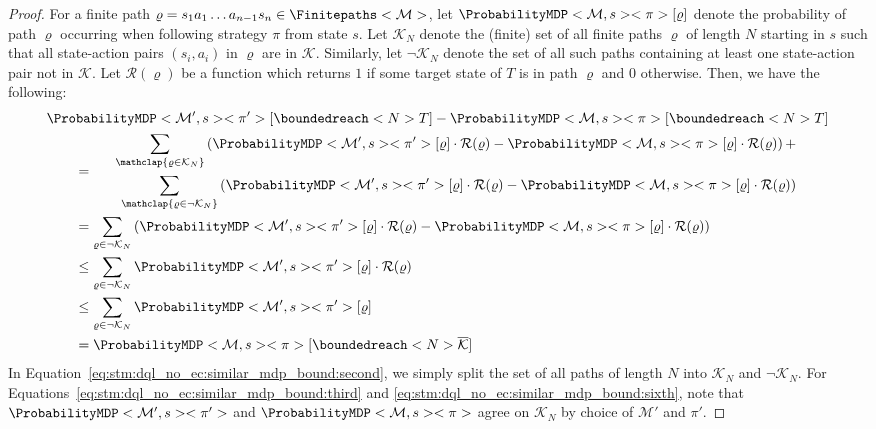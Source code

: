 \documentclass{article}
\newcommand{\MDP}{\mathcal{M}}
\newcommand{\finitepath}{\varrho}
\newcommand{\strategy}{\pi}
\newcommand{\targetset}{T}
\begin{document}
\begin{proof}
	For a finite path $\finitepath = s_1 a_1 \ldots a_{n-1} s_n \in \Finitepaths<\MDP>$, let $\ProbabilityMDP<\MDP, s><\strategy>[\finitepath]$ denote the probability of path $\finitepath$ occurring when following strategy $\strategy$ from state $s$.
	Let $\mathcal{K}_N$ denote the (finite) set of all finite paths $\finitepath$ of length $N$ starting in $s$ such that all state-action pairs $(s_i, a_i)$ in $\finitepath$ are in $\mathcal{K}$.
	Similarly, let $\lnot \mathcal{K}_N$ denote the set of all such paths containing at least one state-action pair not in $\mathcal{K}$.
	Let $\mathcal{R}(\finitepath)$ be a function which returns $1$ if some target state of $\targetset$ is in path $\finitepath$ and $0$ otherwise.
	Then, we have the following:
	\begin{align}
		& \ProbabilityMDP<\MDP', s><\strategy'>[\boundedreach<N> \targetset] - \ProbabilityMDP<\MDP, s><\strategy>[\boundedreach<N> \targetset] \label{eq:stm:dql_no_ec:similar_mdp_bound:first} \\
		& \qquad = \begin{aligned}
				\sum_{\mathclap{\finitepath \in \mathcal{K}_N}} \left( \ProbabilityMDP<\MDP', s><\strategy'>[\finitepath] \cdot \mathcal{R}(\finitepath) - \ProbabilityMDP<\MDP, s><\strategy>[\finitepath] \cdot \mathcal{R}(\finitepath) \right) + & \\
				\qquad \sum_{\mathclap{\finitepath \in \lnot \mathcal{K}_N}} \left( \ProbabilityMDP<\MDP', s><\strategy'>[\finitepath] \cdot \mathcal{R}(\finitepath) - \ProbabilityMDP<\MDP, s><\strategy>[\finitepath] \cdot \mathcal{R}(\finitepath) \right) &
			\end{aligned} \label{eq:stm:dql_no_ec:similar_mdp_bound:second} \\
		& \qquad = \sum_{\finitepath \in \lnot \mathcal{K}_N} \left( \ProbabilityMDP<\MDP', s><\strategy'>[\finitepath] \cdot \mathcal{R}(\finitepath) - \ProbabilityMDP<\MDP, s><\strategy>[\finitepath] \cdot \mathcal{R}(\finitepath) \right) \label{eq:stm:dql_no_ec:similar_mdp_bound:third} \\
		& \qquad \leq \sum_{\finitepath \in \lnot \mathcal{K}_N} \ProbabilityMDP<\MDP', s><\strategy'>[\finitepath] \cdot \mathcal{R}(\finitepath) \label{eq:stm:dql_no_ec:similar_mdp_bound:fourth} \\
		& \qquad \leq \sum_{\finitepath \in \lnot \mathcal{K}_N} \ProbabilityMDP<\MDP', s><\strategy'>[\finitepath] \label{eq:stm:dql_no_ec:similar_mdp_bound:fifth} \\
		& \qquad = \ProbabilityMDP<\MDP, s><\strategy>[\boundedreach<N> \overline{\mathcal{K}}] \label{eq:stm:dql_no_ec:similar_mdp_bound:sixth}
	\end{align}
	In Equation~\eqref{eq:stm:dql_no_ec:similar_mdp_bound:second}, we simply split the set of all paths of length $N$ into $\mathcal{K}_N$ and $\lnot \mathcal{K}_N$.
	For Equations~\eqref{eq:stm:dql_no_ec:similar_mdp_bound:third} and \eqref{eq:stm:dql_no_ec:similar_mdp_bound:sixth}, note that $\ProbabilityMDP<\MDP', s><\strategy'>$ and $\ProbabilityMDP<\MDP, s><\strategy>$ agree on $\mathcal{K}_N$ by choice of $\MDP'$ and $\strategy'$. 
\end{proof}
\end{document}
